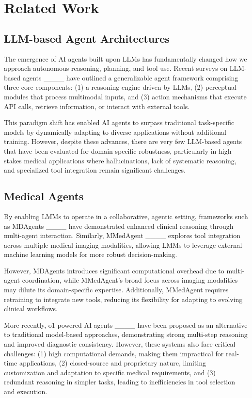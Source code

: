 \section{Related Work}
\subsection{LLM-based Agent Architectures}
The emergence of AI agents built upon LLMs has fundamentally changed how we approach autonomous reasoning, planning, and tool use. Recent surveys on LLM-based agents ____ have outlined a generalizable agent framework comprising three core components: (1) a reasoning engine driven by LLMs, (2) perceptual modules that process multimodal inputs, and (3) action mechanisms that execute API calls, retrieve information, or interact with external tools.

This paradigm shift has enabled AI agents to surpass traditional task-specific models by dynamically adapting to diverse applications without additional training. However, despite these advances, there are very few LLM-based agents that have been evaluated for domain-specific robustness, particularly in high-stakes medical applications where hallucinations, lack of systematic reasoning, and specialized tool integration remain significant challenges.

\subsection{Medical Agents}
By enabling LMMs to operate in a collaborative, agentic setting, frameworks such as MDAgents ____ have demonstrated enhanced clinical reasoning through multi-agent interaction. Similarly, MMedAgent ____ explores tool integration across multiple medical imaging modalities, allowing LMMs to leverage external machine learning models for more robust decision-making.

However, MDAgents introduces significant computational overhead due to multi-agent coordination, while MMedAgent’s broad focus across imaging modalities may dilute its domain-specific expertise. Additionally, MMedAgent requires retraining to integrate new tools, reducing its flexibility for adapting to evolving clinical workflows.

More recently, o1-powered AI agents ____ have been proposed as an alternative to traditional model-based approaches, demonstrating strong multi-step reasoning and improved diagnostic consistency. However, these systems also face critical challenges: (1) high computational demands, making them impractical for real-time applications, (2) closed-source and proprietary nature, limiting customization and adaptation to specific medical requirements, and (3) redundant reasoning in simpler tasks, leading to inefficiencies in tool selection and execution.

